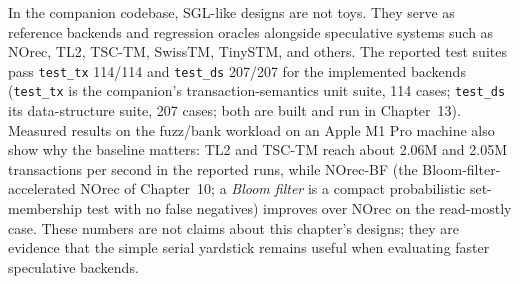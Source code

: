 In the companion codebase, SGL-like designs are not toys. They serve as reference backends and regression oracles alongside speculative systems such as NOrec, TL2, TSC-TM, SwissTM, TinySTM, and others. The reported test suites pass \texttt{test\_tx} 114/114 and \texttt{test\_ds}
207/207 for the implemented backends (\texttt{test\_tx} is the companion's
transaction-semantics unit suite, 114 cases; \texttt{test\_ds} its
data-structure suite, 207 cases; both are built and run in Chapter~13).
Measured results on the fuzz/bank workload on an Apple M1 Pro machine also
show why the baseline matters: TL2 and TSC-TM reach about 2.06M and 2.05M
transactions per second in the reported runs, while NOrec-BF (the
Bloom-filter-accelerated NOrec of Chapter~10; a \emph{Bloom filter} is a
compact probabilistic set-membership test with no false negatives) improves
over NOrec on the read-mostly case. These numbers are not claims about this chapter's designs; they are evidence that the simple serial yardstick remains useful when evaluating faster speculative backends.

